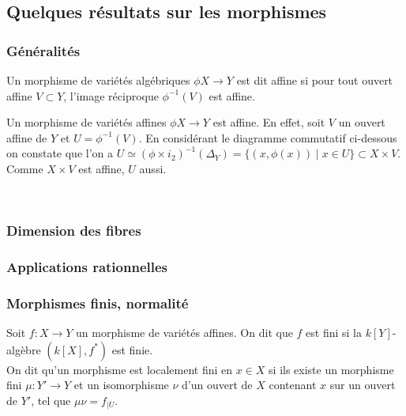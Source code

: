 \subsection{Quelques résultats sur les morphismes}
\subsubsection{Généralités}

\begin{defn}
Un morphisme de variétés algébriques $\phi X\rightarrow Y$ est dit affine si pour tout ouvert affine $V\subset Y$, l'image réciproque $\phi^{-1}(V)$ est affine.
\end{defn}

\begin{ex}\label{exaff}
Un morphisme de variétés affines $\phi X\rightarrow Y$ est affine. En effet, soit $V$ un ouvert affine de $Y$ et $U=\phi^{-1}(V)$. En considérant le diagramme commutatif ci-dessous on constate que l'on a $U \simeq (\phi\times i_2)^{-1}(\Delta_Y)=\lbrace (x,\phi(x))\mid x\in U \rbrace \subset X\times V$. Comme $X\times V$ est affine, $U$ aussi.
	\begin{center}
	\\
	\end{center}

\end{ex}

\subsubsection{Dimension des fibres}

\subsubsection{Applications rationnelles}

\subsubsection{Morphismes finis, normalité}

\begin{defn}
Soit $f:X \rightarrow Y$ un morphisme de variétés affines. On dit que $f$ est fini si la $k[Y]$-algèbre $(k[X], f^*)$ est finie.\\
On dit qu'un morphisme est localement fini en $x\in X$ si ils existe un morphisme fini $\mu:Y' \rightarrow Y$ et un isomorphisme $\nu$ d'un ouvert de $X$ contenant $x$ sur un ouvert de $Y'$, tel que $\mu\nu =f_{|U}$.
\end{defn}

